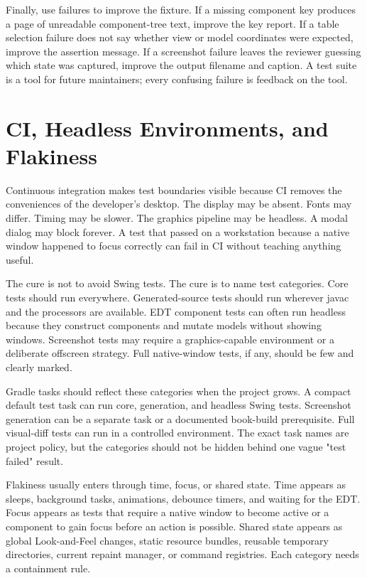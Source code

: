 Finally, use failures to improve the fixture. If a missing component key produces a page of unreadable component-tree text, improve the key report. If a table selection failure does not say whether view or model coordinates were expected, improve the assertion message. If a screenshot failure leaves the reviewer guessing which state was captured, improve the output filename and caption. A test suite is a tool for future maintainers; every confusing failure is feedback on the tool.

\section{CI, Headless Environments, and Flakiness}

Continuous integration makes test boundaries visible because CI removes the conveniences of the developer's desktop. The display may be absent. Fonts may differ. Timing may be slower. The graphics pipeline may be headless. A modal dialog may block forever. A test that passed on a workstation because a native window happened to focus correctly can fail in CI without teaching anything useful.

The cure is not to avoid Swing tests. The cure is to name test categories. Core tests should run everywhere. Generated-source tests should run wherever javac and the processors are available. EDT component tests can often run headless because they construct components and mutate models without showing windows. Screenshot tests may require a graphics-capable environment or a deliberate offscreen strategy. Full native-window tests, if any, should be few and clearly marked.

Gradle tasks should reflect these categories when the project grows. A compact default test task can run core, generation, and headless Swing tests. Screenshot generation can be a separate task or a documented book-build prerequisite. Full visual-diff tests can run in a controlled environment. The exact task names are project policy, but the categories should not be hidden behind one vague "test failed" result.

Flakiness usually enters through time, focus, or shared state. Time appears as sleeps, background tasks, animations, debounce timers, and waiting for the EDT. Focus appears as tests that require a native window to become active or a component to gain focus before an action is possible. Shared state appears as global Look-and-Feel changes, static resource bundles, reusable temporary directories, current repaint manager, or command registries. Each category needs a containment rule.

